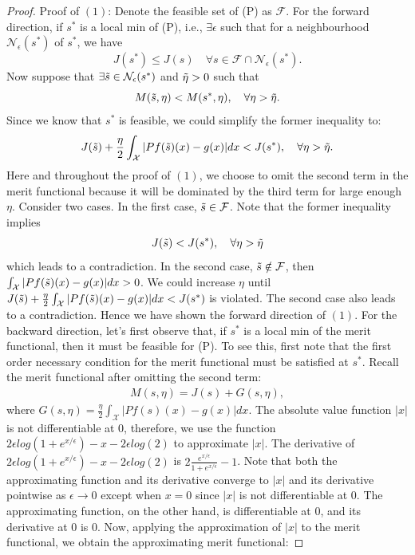 \documentclass[12pt,leqno]{amsart}
\begin{document}
\begin{proof}
    Proof of $(1)$: Denote the feasible set of (P) as $\mathcal{F}$. For the forward direction, if $s^*$ is a local min of (P), i.e., $\exists \epsilon$ such that for a neighbourhood $\mathcal{N}_{\epsilon}(s^*)$ of $s^*$, we have 
    \[
    J(s^*)\leq J(s)\quad\forall s\in \mathcal{F}\cap\mathcal{N}_{\epsilon}(s^*).
    \]
    Now suppose that $\exists\Tilde{s}\in \mathcal{N}_{\epsilon}(s^*)$ and $\Tilde{\eta}>0$ such that 
    \[
    M(\Tilde{s}, \eta)<M(s^*, \eta),\quad\forall\eta>\Tilde{\eta}.
    \]
    Since we know that $s^*$ is feasible, we could simplify the former inequality to:
    \[
    J(\Tilde{s})+\frac{\eta}{2}\int_{\mathcal{X}}|Pf(\Tilde{s})(x)-g(x)|dx<J(s^*),\quad\forall\eta>\Tilde{\eta}.
    \]
    Here and throughout the proof of $(1)$, we choose to omit the second term in the merit functional because it will be dominated by the third term for large enough $\eta$. Consider two cases. In the first case, $\Tilde{s}\in\mathcal{F}$. Note that the former inequality implies
    \[
    J(\Tilde{s})<J(s^*),\quad\forall\eta>\Tilde{\eta}
    \]
    which leads to a contradiction. In the second case, $\Tilde{s}\notin\mathcal{F}$, then $\int_{\mathcal{X}}|Pf(\Tilde{s})(x)-g(x)|dx>0$. We could increase $\eta$ until $J(\Tilde{s})+\frac{\eta}{2}\int_{\mathcal{X}}|Pf(\Tilde{s})(x)-g(x)|dx<J(s^*)$ is violated. The second case also leads to a contradiction. Hence we have shown the forward direction of $(1)$. For the backward direction, let's first observe that, if $s^*$ is a local min of the merit functional, then it must be feasible for (P). To see this, first note that the first order necessary condition for the merit functional must be satisfied at $s^*$. Recall the merit functional after omitting the second term:
    \begin{align*}
        M(s,\eta)=J(s)+G(s,\eta),
    \end{align*}
    where $G(s,\eta)=\frac{\eta}{2}\int_{\mathcal{X}}|Pf(s)(x)-g(x)|dx$. The absolute value function $|x|$ is not differentiable at 0, therefore, we use the function $2\epsilon log(1+e^{x/\epsilon})-x-2\epsilon log(2)$ to approximate $|x|$. The derivative of $2\epsilon log(1+e^{x/\epsilon})-x-2\epsilon log(2)$ is $2\frac{e^{x/\epsilon}}{1+e^{x/\epsilon}}-1$. Note that both the approximating function and its derivative converge to $|x|$ and its derivative pointwise as $\epsilon\to 0$ except when $x=0$ since $|x|$ is not differentiable at 0. The approximating function, on the other hand, is differentiable at 0, and its derivative at 0 is 0. Now, applying the approximation of $|x|$ to the merit functional, we obtain the approximating merit functional:

\end{proof}
\end{document}
